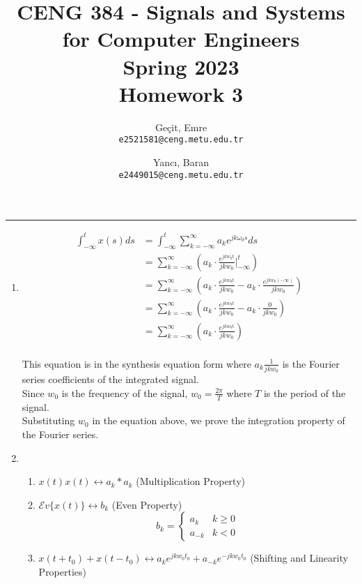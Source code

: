 \documentclass[10pt,a4paper, margin=1in]{article}
\author{
  Geçit, Emre\\
  \texttt{e2521581@ceng.metu.edu.tr}
  \and
  Yancı, Baran\\
  \texttt{e2449015@ceng.metu.edu.tr}
}
\title{CENG 384 - Signals and Systems for Computer Engineers \\
Spring 2023 \\
Homework 3}
\begin{document}
\maketitle



\noindent\rule{19cm}{1.2pt}

\begin{enumerate}

\item \begin{align*}
    \int_{-\infty}^t x(s) ds &= \int_{-\infty}^{t} \sum_{k=-\infty}^{\infty} a_k e^{jk\omega_0 s} ds\\
    &= \sum_{k=-\infty}^{\infty} (a_k \cdot \frac{e^{jkw_0t}}{jkw_0} \Big|_{-\infty}^{t})\\
    &= \sum_{k=-\infty}^{\infty} (a_k \cdot \frac{e^{jkw_0t}}{jkw_0} - a_k \cdot \frac{e^{jkw_0 (-\infty)}}{jkw_0})\\
    &= \sum_{k=-\infty}^{\infty} (a_k \cdot \frac{e^{jkw_0t}}{jkw_0} - a_k \cdot \frac{0}{jkw_0})\\
    &= \sum_{k=-\infty}^{\infty} (a_k \cdot \frac{e^{jkw_0t}}{jkw_0})\\
\end{align*}

This equation is in the synthesis equation form where $a_k \frac{1}{jkw_0}$ is the Fourier series coefficients of the integrated signal.\\

Since $w_0$ is the frequency of the signal, $w_0 = \frac{2\pi}{T}$ where $T$ is the period of the signal.\\

Substituting $w_0$ in the equation above, we prove the integration property of the Fourier series.\\

\item %
	\begin{enumerate}
    \item $x(t)x(t) \leftrightarrow a_k \ast a_k$ (Multiplication Property)
    \item $\mathcal{E}v\{x(t)\} \leftrightarrow b_k$ (Even Property) \[b_k= \begin{cases}
        a_k & k \geq 0 \\
        a_{-k} & k < 0
    \end{cases} \]
    \item $x(t+t_0) + x(t-t_0) \leftrightarrow a_k e^{jkw_0t_0} + a_{-k} e^{-jkw_0t_0} $ (Shifting and Linearity Properties)
    \end{enumerate}


\end{enumerate}
\end{document}
